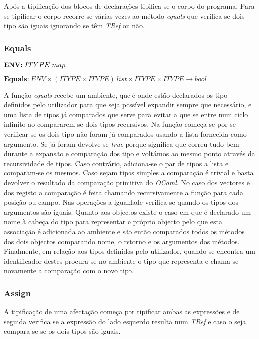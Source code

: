 Após a tipificação dos blocos de declarações tipifica-se o corpo do programa. 
Para se tipificar o corpo recorre-se várias vezes ao método \emph{equals} que 
verifica se dois tipo são iguais ignorando se têm \emph{TRef} ou não.

\subsubsection{Equals}

{
\noindent$
\fontsize{9pt}{10}\selectfont
\textbf{ENV:}~ITYPE~map
$

\noindent$
\textbf{Equals:}~ENV \times (ITYPE \times ITYPE)~list \times ITYPE \times 
														ITYPE \rightarrow bool
$
}

A função \emph{equals} recebe um ambiente, que é onde estão declarados os tipo 
definidos pelo utilizador para que seja possível expandir sempre que 
necessário, e uma lista de tipos já comparados que serve para evitar a que se 
entre num ciclo infinito ao compararem-se dois tipos recursivos. Na função 
começa-se por se verificar se os dois tipo não foram já comparados usando a 
lista fornecida como argumento. Se já foram devolve-se \emph{true} porque 
significa que correu tudo bem durante a expansão e comparação dos tipo e 
voltámos ao mesmo ponto através da recursividade de tipos. Caso contrário, 
adiciona-se o par de tipos a lista e comparam-se os mesmos. Caso sejam tipos 
simples a comparação é trivial e basta devolver o resultado da comparação 
primitiva do \emph{OCaml}. No caso dos vectores e dos registo a comparação é 
feita chamando recursivamente a função para cada posição ou campo. Nas 
operações a igualdade verifica-se quando os tipos dos argumentos são iguais. 
Quanto aos objectos existe o caso em que é declarado um nome à cabeça do tipo 
para representar o próprio objecto pelo que esta associação é adicionada ao 
ambiente e são então comparados todos os métodos dos dois objectos comparando 
nome, o retorno e os argumentos dos métodos. Finalmente, em relação aos tipos 
definidos pelo utilizador, quando se encontra um identificador destes 
procura-se no ambiente o tipo que representa e chama-se novamente a comparação 
com o novo tipo.

\subsubsection{Assign}

A tipificação de uma afectação começa por tipificar ambas as expressões 
e de seguida verifica se a expressão do lado esquerdo resulta num \emph{TRef} 
e caso o seja compara-se se os dois tipos são iguais. 

